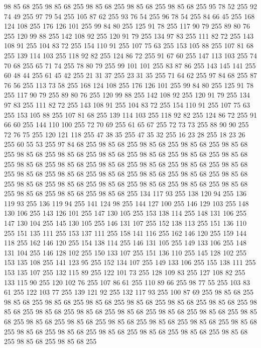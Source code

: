 98 85 68 255 98 85 68 255 98 85 68 255 98 85 68 255 98 85 68 255 95 78 52 255 92 74 49 255 97 79 54 255 105 87 62 255 93 76 54 255 96 78 54 255 84 66 45 255 168 124 108 255 176 126 101 255 99 84 80 255 125 91 78 255 117 90 79 255 89 80 76 255 120 99 88 255 142 108 92 255 120 91 79 255 134 97 83 255 111 82 72 255 143 108 91 255 104 83 72 255 154 110 91 255 107 75 63 255 153 105 88 255 107 81 68 255 139 114 103 255 118 92 82 255 124 86 72 255 91 67 60 255 147 113 103 255 74 70 68 255 65 71 74 255 78 80 79 255 99 101 101 255 83 87 86 255 143 145 141 255 60 48 44 255 61 45 42 255 21 31 37 255 23 31 35 255 71 64 62 255 97 84 68 255 87 76 56 255 113 73 58 255 168 124 108 255 176 126 101 255 99 84 80 255 125 91 78 255 117 90 79 255 89 80 76 255 120 99 88 255 142 108 92 255 120 91 79 255 134 97 83 255 111 82 72 255 143 108 91 255 104 83 72 255 154 110 91 255 107 75 63 255 153 105 88 255
107 81 68 255 139 114 103 255 118 92 82 255 124 86 72 255 91 66 60 255 144 110 100 255 72 70 69 255 61 65 67 255 72 73 73 255 88 90 90 255 72 76 75 255 120 121 118 255 47 38 35 255 47 35 32 255 16 23 28 255 18 23 26 255 60 55 53 255 97 84 68 255 98 85 68 255 98 85 68 255 98 85 68 255 98 85 68 255 98 85 68 255 98 85 68 255 98 85 68 255 98 85 68 255 98 85 68 255 98 85 68 255 98 85 68 255 98 85 68 255 98 85 68 255 98 85 68 255 98 85 68 255 98 85 68 255 98 85 68 255 98 85 68 255 98 85 68 255 98 85 68 255 98 85 68 255 98 85 68 255 98 85 68 255 98 85 68 255 98 85 68 255 98 85 68 255 98 85 68 255 98 85 68 255 98 85 68 255 98 85 68 255 98 85 68 255 134 117 93 255 138 120 94 255 136 119 93 255 136 119 94 255 141 124 98 255 144 127 100 255 146 129 103 255 148 130 106 255 143 126 101 255 147 130 105 255 153 138 114 255 148 131 106 255 147 130 104 255 145 130 105 255 146 131 107 255
152 138 113 255 151 136 110 255 151 135 111 255 153 137 111 255 158 141 116 255 162 146 120 255 159 144 118 255 162 146 120 255 154 138 114 255 146 131 105 255 149 133 106 255 148 131 104 255 146 128 102 255 150 133 107 255 151 136 110 255 145 128 102 255 153 135 108 255 141 123 95 255 152 134 107 255 149 133 106 255 155 138 111 255 153 135 107 255 132 115 89 255 122 101 73 255 128 109 83 255 127 108 82 255 133 115 90 255 120 102 76 255 107 86 61 255 110 89 66 255 98 77 55 255 103 83 61 255 122 103 77 255 139 121 92 255 132 117 93 255 100 87 69 255 98 85 68 255 98 85 68 255 98 85 68 255 98 85 68 255 98 85 68 255 98 85 68 255 98 85 68 255 98 85 68 255 98 85 68 255 98 85 68 255 98 85 68 255 98 85 68 255 98 85 68 255 98 85 68 255 98 85 68 255 98 85 68 255 98 85 68 255 98 85 68 255 98 85 68 255 98 85 68 255 98 85 68 255 98 85 68 255 98 85 68 255 98 85 68 255 98 85 68 255 98 85 68 255 98 85 68 255 98 85 68 255

